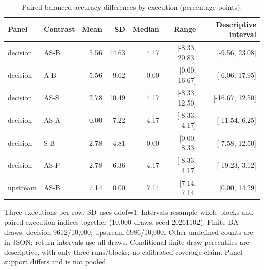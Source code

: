 \begin{table}[htbp]
\centering\small
\caption{Paired balanced-accuracy differences by execution (percentage points).}
\label{tab:r3_contrasts}
\setlength{\tabcolsep}{3.5pt}
\begin{tabular}{llrrrrr}
\hline
Panel & Contrast & Mean & SD & Median & Range & Descriptive interval \\
\hline
decision & AS-B & 5.56 & 14.63 & 4.17 & [-8.33, 20.83] & [-9.56, 23.08] \\
decision & A-B & 5.56 & 9.62 & 0.00 & [0.00, 16.67] & [-6.06, 17.95] \\
decision & AS-S & 2.78 & 10.49 & 4.17 & [-8.33, 12.50] & [-16.67, 12.50] \\
decision & AS-A & -0.00 & 7.22 & 4.17 & [-8.33, 4.17] & [-11.54, 6.25] \\
decision & S-B & 2.78 & 4.81 & 0.00 & [0.00, 8.33] & [-7.58, 12.50] \\
decision & AS-P & -2.78 & 6.36 & -4.17 & [-8.33, 4.17] & [-19.23, 3.12] \\
upstream & AS-B & 7.14 & 0.00 & 7.14 & [7.14, 7.14] & [0.00, 14.29] \\
\hline
\end{tabular}
\par\smallskip\footnotesize Three executions per row. SD uses ddof=1. Intervals resample whole blocks and paired execution indices together (10,000 draws, seed 20261102). Finite BA draws: decision 9612/10,000; upstream 6986/10,000. Other undefined counts are in JSON; return intervals use all draws. Conditional finite-draw percentiles are descriptive, with only three runs/blocks; no calibrated-coverage claim. Panel support differs and is not pooled.
\end{table}
